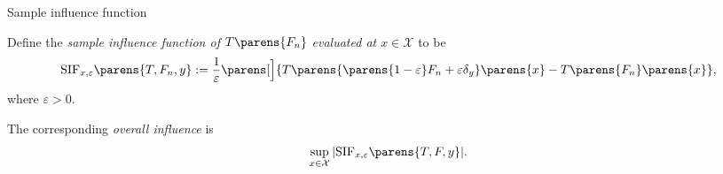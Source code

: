\documentclass[aspectratio=169,xcolor=dvipsnames]{beamer}
\begin{document}
%	
%	    
%			
%			
%			
%		
%	


\begin{frame}{Sample influence function}
	
	Define the \textit{sample influence function of $T \parens{F_n}$ 
	evaluated at $x \in \mathcal{X}$} to be 
	\begin{align}
		\mathrm{SIF}_{x, \varepsilon} \parens{T, F_n, y} := \frac{1}{\varepsilon} \parens[\Big]{T \parens{\parens{1 - \varepsilon} F_n + \varepsilon \delta_y} \parens{x} - T \parens{F_n} \parens{x}}, %
	\end{align}
	where $\varepsilon > 0$. 
	
	\vspace{10pt}
	
	The corresponding \textit{overall influence} is 
	\begin{align*}
		\sup_{x \in \mathcal{X}} \vert \mathrm{SIF}_{x, \varepsilon} \parens{T, F, y} \vert. %
	\end{align*}
	
\end{frame}
\end{document}
